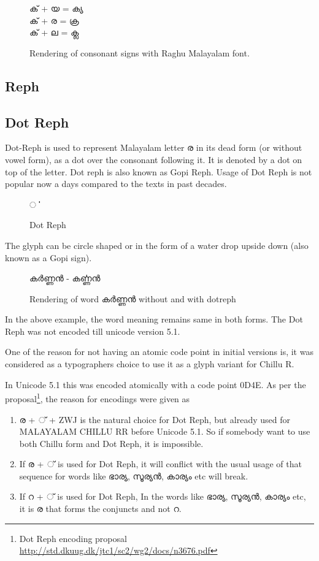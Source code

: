 \begin{figure}[h!]
  \centering
  {\raghumalayalam\textexample ക് + യ = ക്യ \\ ക് + ര = ക്ര \\ ക് + ല = ക്ല }\\
  \caption{Rendering of consonant signs with Raghu Malayalam font.}
\end{figure}

\subsection {Reph}
\subsection {Dot Reph}

Dot-Reph is used to represent Malayalam letter  {\meera ര} in its dead form
(or without vowel form), as a dot over the consonant following it.  It is
denoted by a dot on top of the letter. Dot reph is also known as Gopi Reph.
Usage of Dot Reph is not popular now a days compared to the texts in past
decades.

\begin{figure}[h!]
  \centering
  {\meera\textexample ൎ }\\
  \caption{Dot Reph}
\end{figure}

The glyph can be circle shaped or in the form of a water drop upside down (also
known as a Gopi sign).

\begin{figure}[h!]
  \centering
  {\meera\textexample കര്‍ണ്ണന്‍  - കൎണ്ണന്‍ }\\
  \caption{Rendering of word കര്‍ണ്ണന്‍ without and with dotreph}
\end{figure}

In the above example, the word meaning remains same in both forms. The Dot Reph
was not encoded till unicode version 5.1.

One of the reason for not having an atomic code point in initial versions is,
it was considered as a typographers choice to use it as a glyph variant for Chillu R.

In Unicode 5.1 this was encoded atomically with a code point 0D4E.
As per the proposal\footnote{ Dot Reph encoding proposal \url{http://std.dkuug.dk/jtc1/sc2/wg2/docs/n3676.pdf}},
the reason for encodings were given as

\begin{enumerate}
\item  {\malayalam ര + ് + ZWJ} is the natural choice for Dot Reph, but already used
for MALAYALAM CHILLU RR before Unicode 5.1. So if somebody want to use both
Chillu form and Dot Reph, it is impossible.
\item If {\malayalam ര + ് } is used for Dot Reph, it will conflict with the usual
usage of that sequence for words like {\malayalam ഭാര്യ, സൂര്യന്‍, കാര്യം } etc will break.
\item If {\malayalam റ + ് } is used for Dot Reph, In the words like
{\malayalam ഭാര്യ, സൂര്യന്‍, കാര്യം } etc, it is ര  that forms the conjuncts and not  {\malayalam റ}.
\end{enumerate}


